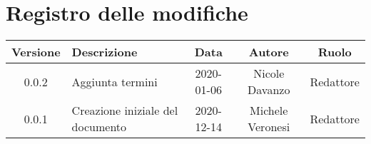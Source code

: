 \section*{Registro delle modifiche}

\begin{center}
	\begin{longtable}{|c|p{5cm}|c|c|c|}
	\hline
	\rowcolor{lighter-grayer}
	\textbf{Versione} & \textbf{Descrizione} & \textbf{Data} & \textbf{Autore} & \textbf{Ruolo} \\
	\hline
	\endfirsthead


	\hline
	0.0.2 & Aggiunta termini & 2020-01-06 & Nicole Davanzo & Redattore \\
	0.0.1 & Creazione iniziale del documento & 2020-12-14 & Michele Veronesi & Redattore \\
	\hline

	\end{longtable}
\end{center}